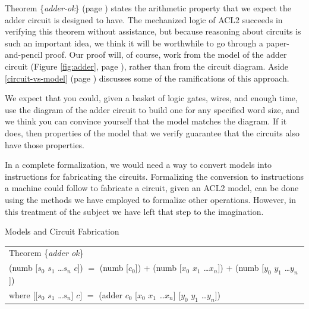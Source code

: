 Theorem \{\emph{adder-ok}\} (page \pageref{fig:adder-thm})
states the arithmetic property that
we expect the adder circuit is designed to have.
The mechanized logic of ACL2 succeeds in verifying
this theorem without assistance,
but because reasoning about circuits is such an important idea,
we think it will be worthwhile to go through
a paper-and-pencil proof.
Our proof will, of course, work from
the model of the adder circuit
(Figure \ref{fig:adder}, page \pageref{fig:adder}),
rather than from the circuit diagram.
Aside \ref{circuit-vs-model} (page \pageref{circuit-vs-model})
discusses some of the ramifications of this approach.

\begin{aside}
We expect that you could, given a basket of
logic gates, wires, and enough time,
use the diagram of the adder circuit to
build one for any specified word size,
and we think you can convince yourself that the model
matches the diagram.
If it does, then properties of the model
that we verify guarantee that the circuits also have those properties.

In a complete formalization, we would
need a way to convert models into instructions
for fabricating the circuits.
Formalizing the conversion to instructions a machine could
follow to fabricate a circuit, given an ACL2 model,
can be done using the methods
we have employed to formalize other operations.
However, in this treatment of the subject
we have left that step to the imagination.
\caption{Models and Circuit Fabrication}
\label{circuit-vs-model}
\end{aside}

\begin{samepage}
\label{adder-thm}
\begin{center}
\begin{tabular}{l}
Theorem \{\emph{adder ok}\} \\
(numb [$s_0$ $s_1$ \dots $s_{n}$ $c$]) $=$
(numb [$c_0$]) + (numb [$x_0$ $x_1$ \dots $x_{n}$]) + (numb [$y_0$ $y_1$ \dots $y_{n}$]) \\
where [[$s_0$ $s_1$ \dots $s_{n}$] $c$] $=$ (adder $c_0$ [$x_0$ $x_1$ \dots $x_{n}$] [$y_0$ $y_1$ \dots $y_{n}$])\\
\end{tabular}
\end{center}
\end{samepage}

